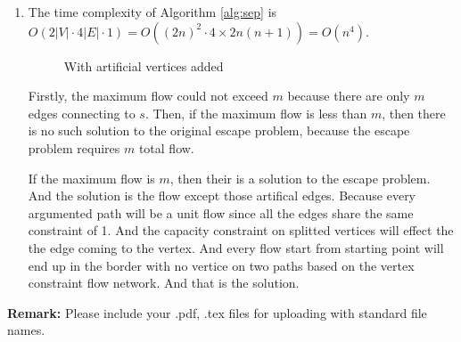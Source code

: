 \documentclass[12pt,a4paper]{article}
\makeatletter
\newtheorem*{solution}{Solution}
\theoremstyle{definition}
\renewenvironment{solution}[1][Solution] {\par\pushQED{\qed}\normalfont\topsep6\p@\@plus6\p@\relax\trivlist\item[\hskip\labelsep\bfseries#1\@addpunct{.}]\ignorespaces}{\popQED\endtrivlist\@endpefalse} \makeatother
\makeatother
\begin{document}
\begin{enumerate}
\begin{enumerate}
\begin{solution}
			The time complexity of Algorithm \ref{alg:sep} is $O(2|V|\cdot 4|E|\cdot 1)=O((2n)^2\cdot 4\times 2n(n+1))=O(n^4)$.

			\begin{figure}[h]
				\centering
				
				\caption{With artificial vertices added}
				\label{fig:es}
			\end{figure}

			Firstly, the maximum flow could not exceed $m$ because there are only $m$ edges connecting to $s$. Then, if the maximum flow is less than $m$, then there is no such solution to the original escape problem, because the escape problem requires $m$ total flow.

			If the maximum flow is $m$, then their is a solution to the escape problem. And the solution is the flow except those artifical edges. Because every argumented path will be a unit flow since all the edges share the same constraint of 1. And the capacity constraint on splitted vertices will effect the the edge coming to the vertex. And every flow start from starting point will end up in the border with no vertice on two paths based on the vertex constraint flow network. And that is the solution.
		\end{solution}
    \end{enumerate}
\end{enumerate}

\textbf{Remark:} Please include your .pdf, .tex files for uploading with standard file names.
\newpage


\end{document}
